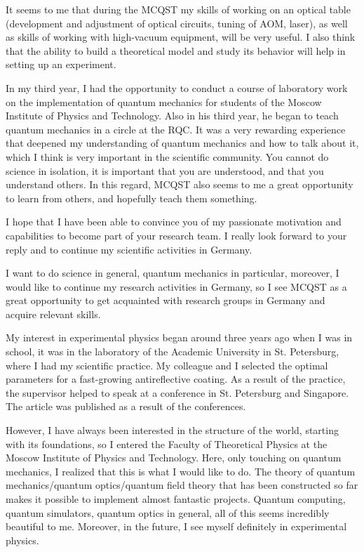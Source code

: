 It seems to me that during the MCQST my skills of working on an optical table (development and adjustment of optical circuits, tuning of AOM, laser), as well as skills of working with high-vacuum equipment, will be very useful. I also think that the ability to build a theoretical model and study its behavior will help in setting up an experiment.


In my third year, I had the opportunity to conduct a course of laboratory work on the implementation of quantum mechanics for students of the Moscow Institute of Physics and Technology. Also in his third year, he began to teach quantum mechanics in a circle at the RQC. It was a very rewarding experience that deepened my understanding of quantum mechanics and how to talk about it, which I think is very important in the scientific community. You cannot do science in isolation, it is important that you are understood, and that you understand others. In this regard, MCQST also seems to me a great opportunity to learn from others, and hopefully teach them something.



I hope that I have been able to convince you of my passionate motivation and capabilities to become part of your research team. I really look forward to your reply and to continue my scientific activities in Germany.



I want to do science in general, quantum mechanics in particular, moreover, I would like to continue my research activities in Germany, so I see MCQST as a great opportunity to get acquainted with research groups in Germany and acquire relevant skills.

My interest in experimental physics began around three years ago when I
was in school, it was in the laboratory of the Academic University in St. Petersburg, where I had my scientific practice. My colleague and I selected the optimal parameters for a fast-growing antireflective coating. As a result of the practice, the supervisor helped to speak at a conference in St. Petersburg and Singapore. The article was published as a result of the conferences.

However, I have always been interested in the structure of the world, starting with its foundations, so I entered the Faculty of Theoretical Physics at the Moscow Institute of Physics and Technology. Here, only touching on quantum mechanics, I realized that this is what I would like to do. The theory of quantum mechanics/quantum optics/quantum field theory that has been constructed so far makes it possible to implement almost fantastic projects.
Quantum computing, quantum simulators, quantum optics in general, all of this seems incredibly beautiful to me. Moreover, in the future, I see myself definitely in experimental physics.

